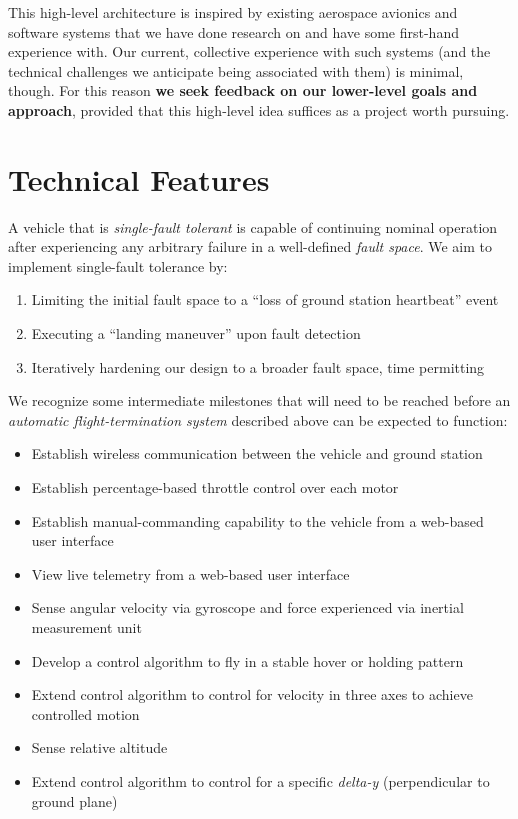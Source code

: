 \documentclass{article}
\begin{document}
\noindent This high-level architecture is inspired by existing aerospace
avionics and software systems that we have done research on
and have some first-hand experience with. Our current, collective
experience with such systems (and the technical challenges we
anticipate being associated with them) is minimal, though. For
this reason \textbf{we seek feedback on our lower-level goals and
approach}, provided that this high-level idea suffices as
a project worth pursuing.

\section{Technical Features}

A vehicle that is \textit{single-fault tolerant} is capable of continuing
nominal operation after experiencing any arbitrary failure in a well-defined
\textit{fault space}. We aim to implement single-fault tolerance by:

\begin{enumerate}
	\item Limiting the initial fault space to a ``loss of ground station
		heartbeat'' event
	\item Executing a ``landing maneuver'' upon fault detection
	\item Iteratively hardening our design to a broader fault space,
		time permitting
\end{enumerate}

\noindent We recognize some intermediate milestones that will need to be reached
before an \textit{automatic flight-termination system} described above can be
expected to function:

\begin{itemize}
	\item Establish wireless communication between the vehicle and
		ground station
	\item Establish percentage-based throttle control over each motor
	\item Establish manual-commanding capability to the vehicle from a
		web-based user interface
	\item View live telemetry from a web-based user interface
	\item Sense angular velocity via gyroscope and force experienced via
		inertial measurement unit
	\item Develop a control algorithm to fly in a stable hover or
		holding pattern
	\item Extend control algorithm to control for velocity in three axes
		to achieve controlled motion
	\item Sense relative altitude
	\item Extend control algorithm to control for a specific \textit{delta-y}
		(perpendicular to ground plane) 
\end{itemize}
\end{document}
